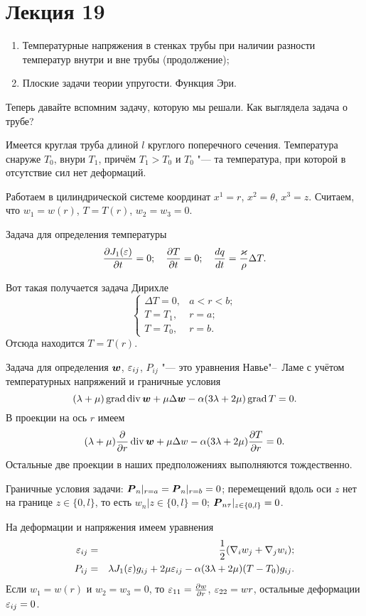 \section{Лекция 19}
\begin{enumerate}
\item Температурные напряжения в стенках трубы при наличии разности температур внутри и вне трубы (продолжение);
\item Плоские задачи теории упругости. Функция Эри.
\end{enumerate}

Теперь давайте вспомним задачу, которую мы решали. Как выглядела задача о трубе?

Имеется круглая труба длиной $l$ круглого поперечного сечения. Температура снаруже $T_0$, внури $T_1$, причём $T_1>T_0$ и $T_0$ "--- та температура, при которой в отсутствие сил нет деформаций.

 Работаем в цилиндрической системе координат $x^1=r$, $x^2 = \theta$, $x^3=z$. Считаем, что $w_1 = w(r)$, $T=T(r)$, $w_2=w_3=0$.

Задача для определения температуры
\[
  \frac{\partial J_1(\varepsilon)}{\partial t} = 0;\quad
  \frac{\partial T}{\partial t}=0;\quad
  \frac{dq}{dt} = \frac{\varkappa}\rho\Delta T.
\]

Вот такая получается задача Дирихле
\[
\begin{cases}
  \Delta T = 0,& a<r<b;\\
  T=T_1,& r=a;\\
  T = T_0,& r=b.
\end{cases}
\]
Отсюда находится $T = T(r)$.

Задача для определения $\boldsymbol{w}$, $\varepsilon_{ij}$, $P_{ij}$ "--- это уравнения Навье"--~Ламе с учётом температурных напряжений и граничные условия
\[
  (\lambda+\mu)\operatorname{grad}\operatorname{div}\boldsymbol{w} + \mu\Delta\boldsymbol{w} - \alpha(3\lambda+2\mu)\operatorname{grad} T = 0.
\]
В проекции на ось $r$ имеем
\[
  (\lambda+\mu)\frac{\partial  }{\partial r}\operatorname{div}\boldsymbol{w} + \mu \Delta w - \alpha(3\lambda + 2\mu)\frac{\partial T}{\partial r} = 0.
\]
Остальные две проекции в наших предположениях выполняются тождественно.

Граничные условия задачи: $\boldsymbol{P}_n|_{r=a} = \boldsymbol{P}_n|_{r=b}=0$; перемещений вдоль оси $z$ нет на границе $z\in\{0,l\}$, то есть $w_n|{z\in\{0,l\}} = 0$; $\boldsymbol{P}_{n\tau}|_{z\in\{0,l\}}=0$.

На деформации и напряжения имеем уравнения
\begin{eqnarray*}
  \varepsilon_{ij} &=&  \frac12(\nabla_i w_j+ \nabla_j w_i);\\
  P_{ij} &=&  \lambda J_1(\varepsilon)g_{ij} + 2\mu \varepsilon_{ij} - \alpha(3\lambda + 2\mu)(T-T_0)g_{ij}.
\end{eqnarray*}
Если $w_1 = w(r)$ и $w_2=w_3=0$, то $\varepsilon_{11} = \frac{\partial w}{\partial r}$, $\varepsilon_{22} = wr$, остальные деформации $\varepsilon_{ij}=0$.

